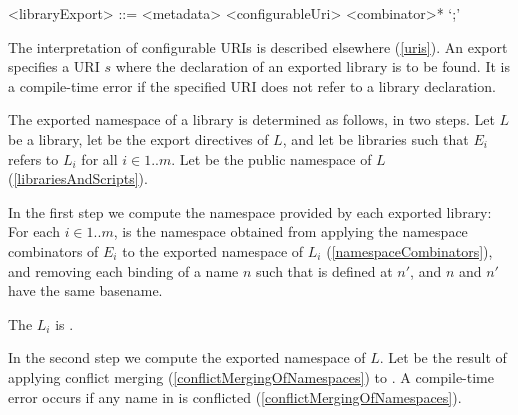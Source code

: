 \documentclass[makeidx]{article}
\begin{document}
{\begin{grammar}
<libraryExport> ::= <metadata> \EXPORT{} <configurableUri> <combinator>* `;'
\end{grammar}

\LMHash{}%
The interpretation of configurable URIs is described elsewhere
(\ref{uris}).
An export specifies a URI $s$
where the declaration of an exported library is to be found.
It is a compile-time error if the specified URI
does not refer to a library declaration.

\LMHash{}%
The exported namespace of a library is determined as follows, in two steps.
Let $L$ be a library,
let  be the export directives of $L$,
and let  be libraries
such that $E_i$ refers to $L_i$ for all $i \in 1 .. m$.
Let  be the public namespace of $L$
(\ref{librariesAndScripts}).


\LMHash{}%
In the first step we compute the namespace provided by each exported library:
For each $i \in 1 .. m$,
 is
the namespace obtained from applying
the namespace combinators of $E_i$ to
the exported namespace of $L_i$
(\ref{namespaceCombinators}),
and removing each binding of a name $n$ such that
 is defined at $n'$,
and $n$ and $n'$ have the same basename.

\LMHash{}%
The
$L_i$ is .

\LMHash{}%
In the second step we compute the exported namespace of $L$.
Let  be the result of applying
conflict merging
(\ref{conflictMergingOfNamespaces})
to .
A compile-time error occurs if any name in
is conflicted
(\ref{conflictMergingOfNamespaces}).


}
\end{document}
